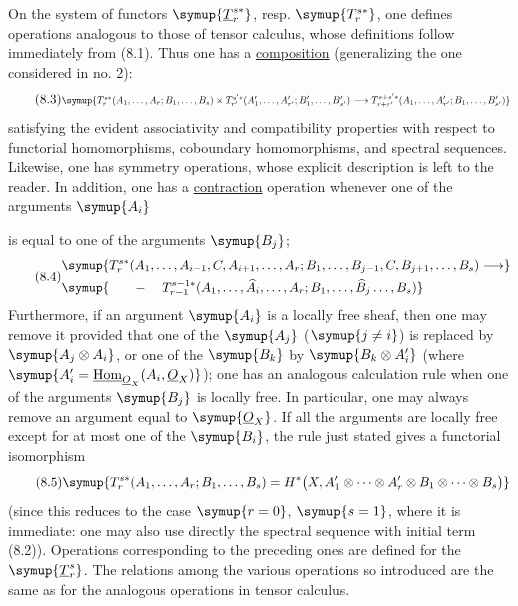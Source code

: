 On the system of functors $\symup{\underline{T}_{r}^{s*}}$, resp. $\symup{T_{r}^{s*}}$,
one defines operations analogous to those of tensor calculus, whose definitions
follow immediately from (8.1). Thus one has a \uline{composition} (generalizing the
one considered in no. 2):
\begin{equation}\tag{8.3}
\resizebox{\textwidth}{!}{$\symup{
T_{r}^{s*}(A_1,\ldots,A_r;B_1,\ldots,B_s)
\times T_{r'}^{s'*}(A'_1,\ldots,A'_{r'};B'_1,\ldots,B'_{s'})
\longrightarrow T_{r+r'}^{s+s'*}
(A_1,\ldots,A'_{r'};B_1,\ldots,B'_{s'})
}$}
\end{equation}
satisfying the evident associativity and compatibility properties with respect
to functorial homomorphisms, coboundary homomorphisms, and spectral sequences.
Likewise, one has symmetry operations, whose explicit description is left to
the reader. In addition, one has a \uline{contraction} operation whenever one of the
arguments $\symup{A_i}$

is equal to one of the arguments $\symup{B_j}$;
\begin{equation}\tag{8.4}
\resizebox{\textwidth}{!}{$
\begin{aligned}
&
\symup{T_{r}^{s*}(A_1,\ldots,A_{i-1},C,A_{i+1},\ldots,A_r;
 B_1,\ldots,B_{j-1},C,B_{j+1},\ldots,B_s)\longrightarrow}
\\
&
\symup{\qquad\relbar\quad
T_{r-1}^{s-1*}(A_1,\ldots,\widehat{A}_i,\ldots,A_r;
 B_1,\ldots,\widehat{B}_j\ldots,B_s)}
\end{aligned}
$}
\end{equation}
Furthermore, if an argument $\symup{A_i}$ is a locally free sheaf, then one may remove it
provided that one of the $\symup{A_j}$ ($\symup{j\neq i}$) is replaced by $\symup{A_j\otimes A_i}$, or
one of the $\symup{B_k}$ by $\symup{B_k\otimes A_i'}$ (where
$\symup{A_i'=\Homsh_{\Osh_X}(A_i,\Osh_X)}$); one has an analogous calculation rule
when one of the arguments $\symup{B_j}$ is locally free. In particular, one may always remove an argument
equal to $\symup{\Osh_X}$. If all the arguments are locally free
except for at most one of the $\symup{B_i}$, the rule just stated gives a functorial
isomorphism
\begin{equation}\tag{8.5}
  \symup{T_{r}^{s*}(A_1,\ldots,A_r;B_1,\ldots,B_s)
  =H^{*}\bigl(X,A_1'\otimes\cdots\otimes A_r'
    \otimes B_1\otimes\cdots\otimes B_s\bigr)}
\end{equation}
(since this reduces to the case $\symup{r=0}$, $\symup{s=1}$, where it is immediate: one may
also use directly the spectral sequence with initial term (8.2)). Operations
corresponding to the preceding ones are defined for the
$\symup{\underline{T}_{r}^{s}}$. The relations among the various operations so
introduced are the same as for the analogous operations in tensor calculus.

